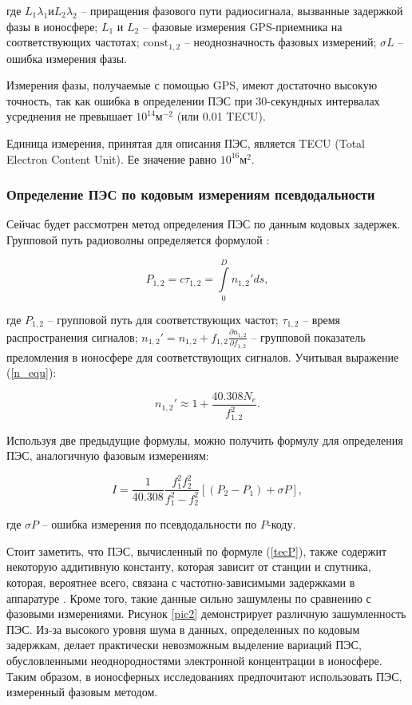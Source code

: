 \documentclass[14pt]{article}
\begin{document}
где $L_1\lambda_1 \text{и} L_2 \lambda_2$ -- приращения фазового пути радиосигнала, вызванные задержкой фазы в ионосфере; $L_1$ и $L_2$ -- фазовые измерения GPS-приемника на соответствующих частотах; $\text{const}_{1,2}$ -- неоднозначность фазовых измерений; $\sigma L$ -- ошибка измерения фазы.

Измерения фазы, получаемые с помощью GPS, имеют достаточно высокую точность, так как ошибка в определении ПЭС при 30-секундных интервалах усреднения не превышает $10^{14} \text{м}^{-2}$ (или 0.01 TECU). 

Единица измерения, принятая для описания ПЭС, является TECU (Total Electron Content Unit). Ее значение равно $10^{16} \text{м}^2$.

\subsubsection{Определение ПЭС по кодовым измерениям псевдодальности}
Сейчас будет рассмотрен метод определения ПЭС  по данным кодовых задержек. Групповой путь радиоволны определяется формулой \cite{devis}:

\begin{equation}
P_{1,2} = c \tau_{1,2} = \int \limits_{0}^{D} n_{1,2}' ds,
\end{equation}

где $P_{1,2}$ -- групповой путь для соответствующих частот; $\tau_{1,2}$ -- время распространения сигналов; 
$n_{1,2}' = n_{1,2} + f_{1,2} \frac{\partial n_{1,2}}{\partial f_{1,2}}$ -- групповой показатель преломления в ионосфере для соответствующих сигналов. Учитывая выражение (\ref{n_equ}):

\begin{equation}
n_{1,2}' \approx 1 + \frac{40.308 N_e}{f_{1,2}^2}.
\end{equation}

Используя две предыдущие формулы, можно получить формулу для определения ПЭС, аналогичную фазовым измерениям:

\begin{equation}
\label{tecP}
I = \frac{1}{40.308} \frac{f_1^2 f_2^2}{f_1^2 - f_2^2} \left[ \left( P_2 - P_1 \right) + \sigma P \right],
\end{equation} 

где $\sigma P $ -- ошибка измерения по псевдодальности по $P$-коду.

Стоит заметить, что ПЭС, вычисленный по формуле (\ref{tecP}), также содержит некоторую аддитивную константу, которая зависит от станции и спутника, которая, вероятнее всего, связана с частотно-зависимыми задержками в аппаратуре \cite{kozharin}. Кроме того, такие данные сильно зашумлены по сравнению с фазовыми измерениями. Рисунок \ref{pic2} демонстрирует различную зашумленность ПЭС. Из-за высокого уровня шума в данных, определенных по кодовым задержкам, делает практически невозможным выделение вариаций ПЭС, обусловленными неоднородностями электронной концентрации в ионосфере. Таким образом, в ионосферных исследованиях предпочитают использовать ПЭС, измеренный фазовым методом. 
\end{document}
